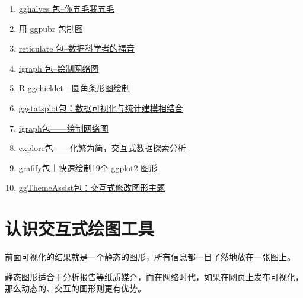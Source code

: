 \documentclass[
]{book}
\begin{document}
\begin{enumerate}
\item
  \href{http://mp.weixin.qq.com/s?__biz=MzI1NjUwMjQxMQ==\&mid=2247486214\&idx=1\&sn=7ff5d7375c615d20cffea6329cccff37\&chksm=ea24f4e2dd537df4a5ebe66a441b2fb0ee0599a05a700e1d199f729c497a68857e8031cd2e61\&scene=21\#wechat_redirect}{gghalves 包--你五毛我五毛}
\item
  \href{http://mp.weixin.qq.com/s?__biz=MzI1NjUwMjQxMQ==\&mid=2247485615\&idx=1\&sn=47ac21f131bf2ac6c90c50fb9fb7966b\&chksm=ea24f74bdd537e5d74f60919388f683dfe779fe8a2d11999e55e290d4bdb25c64e36cc74ccc1\&scene=21\#wechat_redirect}{用 ggpubr 包制图}
\item
  \href{http://mp.weixin.qq.com/s?__biz=MzI1NjUwMjQxMQ==\&mid=2247484515\&idx=1\&sn=26b03b6ad26f2315cdc04049f740f1c0\&chksm=ea24fb87dd537291d5184c28a9c9f2cdda591e4c17a7e7daaff34a9a1c3949ee0e86f9b355b7\&scene=21\#wechat_redirect}{reticulate 包--数据科学者的福音}
\item
  \href{http://mp.weixin.qq.com/s?__biz=MzI1NjUwMjQxMQ==\&mid=2247483780\&idx=1\&sn=46ce562ed91ec2d08d7669477160c249\&chksm=ea24fe60dd53777615de14ec0ad087c1bbc56d46d73eb51e13fdeeaa60633063b4bd415a7d01\&scene=21\#wechat_redirect}{igraph 包--绘制网络图}
\item
  \href{https://mp.weixin.qq.com/s/JqzHEvFfGlDSCdTWhw5uxQ}{R-ggchicklet - 圆角条形图绘制}
\item
  \href{https://mp.weixin.qq.com/s/3IhAxIW6nRYjyWhyepT0kQ}{ggstatsplot包：数据可视化与统计建模相结合}
\item
  \href{https://mp.weixin.qq.com/s/cq7xnbUG01k_v6WzU9Us6A}{igraph包------绘制网络图}
\item
  \href{https://mp.weixin.qq.com/s/qJ7iqCt3VgCTI9erd5XzsQ}{explore包------化繁为简，交互式数据探索分析}
\item
  \href{https://mp.weixin.qq.com/s/KZ1Zy4EYC3Ex5M38zypc3g}{grafify包｜快速绘制19个 ggplot2 图形}
\item
  \href{https://mp.weixin.qq.com/s/NvqznH9kA4E9c9qus0K-8g}{ggThemeAssist包：交互式修改图形主题}
\end{enumerate}

\hypertarget{interactive-ploting}{%
\chapter{认识交互式绘图工具}\label{interactive-ploting}}

前面可视化的结果就是一个静态的图形，所有信息都一目了然地放在一张图上。

静态图形适合于分析报告等纸质媒介，而在网络时代，如果在网页上发布可视化，那么动态的、交互的图形则更有优势。
\end{document}

